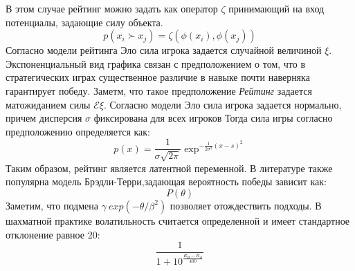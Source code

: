 В этом случае рейтинг можно задать как оператор $\zeta$ принимающий на вход потенциалы, задающие силу объекта.
\begin{equation}
    p(x_i \succ x_j) = \zeta(\phi(x_i),\phi(x_j))
\end{equation}
Согласно модели рейтинга Эло сила игрока задается случайной величиной $\xi$. 
Экспоненциальный вид графика связан с предположением о том, что в стратегических играх существенное различие в навыке 
почти наверняка гарантирует победу. Заметм, что такое предположение
\textit{Рейтинг} задается матожиданием силы $\mathcal{E} \xi$.
Согласно модели Эло сила игрока задается нормально, причем дисперсия $\sigma$ фиксирована для всех игроков
Тогда сила игры согласно предположению определяется как:
\begin{equation}
    p(x) = \frac{1}{\sigma \sqrt{2\pi}} \exp^{- \frac{1}{2\sigma^2}{(x-s)^2}}
\end{equation}
Таким образом, рейтинг является латентной переменной. В литературе также популярна модель Брэдли-Терри,задающая
вероятность победы зависит как:
\begin{equation}
    P(\theta)
\end{equation}
Заметим, что подмена $\gamma ~ exp(-\theta/\beta^2)$ позволяет отождествить подходы.
В шахматной практике волатильность считается определенной и имеет стандартное отклонение равное 20:
\begin{equation}
    \frac{1}{1+10^\frac{R_B-R_A}{400}} 
\end{equation}
